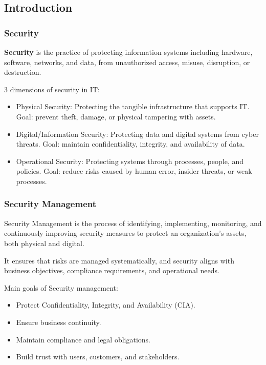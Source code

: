 \subsection{Introduction}

\subsubsection{Security}

\indent 

\textbf{Security} is the practice of protecting information systems including hardware, software, networks, and data, from unauthorized access, misuse, disruption, or destruction.

3 dimensions of security in IT:

\begin{itemize}
    \item Physical Security: Protecting the tangible infrastructure that supports IT. Goal: prevent theft, damage, or physical tampering with assets.
    \item Digital/Information Security: Protecting data and digital systems from cyber threats. Goal: maintain confidentiality, integrity, and availability of data.
    \item Operational Security: Protecting systems through processes, people, and policies. Goal: reduce risks caused by human error, insider threats, or weak processes.
\end{itemize}

\subsubsection{Security Management}

\indent 

Security Management is the process of identifying, implementing, monitoring, and continuously improving security measures to protect an organization’s assets, both physical and digital.

It ensures that risks are managed systematically, and security aligns with business objectives, compliance requirements, and operational needs.

Main goals of Security management:

\begin{itemize}
    \item Protect Confidentiality, Integrity, and Availability (CIA).
    \item Ensure business continuity.
    \item Maintain compliance and legal obligations.
    \item Build trust with users, customers, and stakeholders.
\end{itemize}

